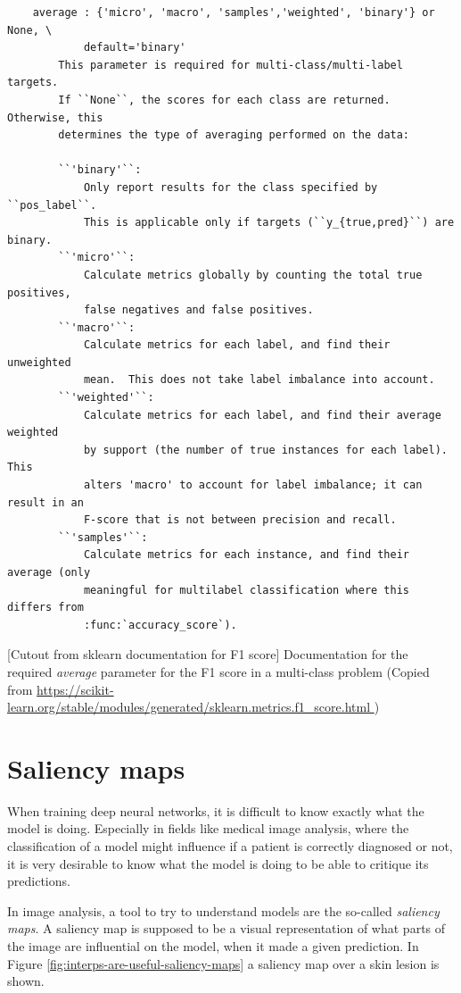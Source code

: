 \begin{center}
    \begin{verbatim}
    average : {'micro', 'macro', 'samples','weighted', 'binary'} or None, \
            default='binary'
        This parameter is required for multi-class/multi-label targets.
        If ``None``, the scores for each class are returned. Otherwise, this
        determines the type of averaging performed on the data:

        ``'binary'``:
            Only report results for the class specified by ``pos_label``.
            This is applicable only if targets (``y_{true,pred}``) are binary.
        ``'micro'``:
            Calculate metrics globally by counting the total true positives,
            false negatives and false positives.
        ``'macro'``:
            Calculate metrics for each label, and find their unweighted
            mean.  This does not take label imbalance into account.
        ``'weighted'``:
            Calculate metrics for each label, and find their average weighted
            by support (the number of true instances for each label). This
            alters 'macro' to account for label imbalance; it can result in an
            F-score that is not between precision and recall.
        ``'samples'``:
            Calculate metrics for each instance, and find their average (only
            meaningful for multilabel classification where this differs from
            :func:`accuracy_score`).
    \end{verbatim}
    [Cutout from sklearn documentation for F1 score]{
        Documentation for the required \textit{average} parameter for the F1 score in a multi-class problem
        (Copied from \url{https://scikit-learn.org/stable/modules/generated/sklearn.metrics.f1_score.html
        })}
    \label{fig:sklearn-f1-average-docs}
\end{center}

\section{Saliency maps}\label{sec:saliency_maps}
When training deep neural networks,
it is difficult to know exactly what the model is doing.
Especially in fields like medical image analysis,
where the classification of a model might influence if a patient is correctly diagnosed or not,
it is very desirable to know what the model is doing to be able to critique its predictions.

In image analysis, a tool to try to understand models are the so-called \textit{saliency maps}.
A saliency map is supposed to be a visual representation of what parts of the image are influential on the model,
when it made a given prediction.
In Figure \ref{fig:interps-are-useful-saliency-maps} a saliency map over a skin lesion is shown. 

